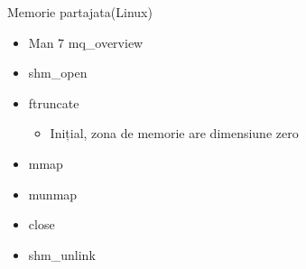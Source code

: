 \documentclass{so.cs.pub.ro}
\begin{document}
\begin{frame}{Memorie partajata(Linux)}
  \begin{itemize}
		\item Man 7 mq_overview
		\vspace{0.3cm}
		\item shm_open
		\vspace{0.3cm}
		\item ftruncate
		  \begin{itemize}
		\item Inițial, zona de memorie are dimensiune zero
		  \end{itemize}
		\vspace{0.3cm}
		\item mmap
		\item munmap
		\vspace{0.3cm}
		\item close
		\item shm_unlink
  \end{itemize}
\end{frame}
\end{document}

